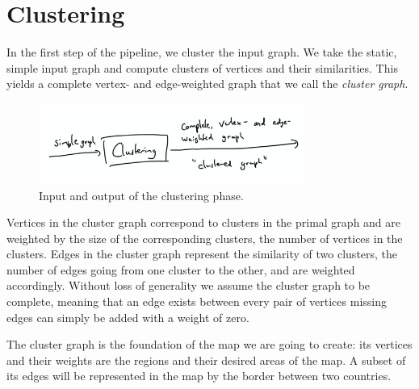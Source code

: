 \section{Clustering}
\label{sect:clustering}

In the first step of the pipeline, we cluster the input graph. We take the static, simple input graph and compute clusters of vertices and their similarities. This yields a complete vertex- and edge-weighted graph that we call the \emph{cluster graph}.

\begin{figure}[H]
	\centering\includegraphics[height=100px]{Resources/Pipeline-Clustering.png}
	\caption{Input and output of the clustering phase.}
	\label{fig:pipeline-clustering}
\end{figure}

Vertices in the cluster graph correspond to clusters in the primal graph and are weighted by the size of the corresponding clusters, \ie{} the number of vertices in the clusters. Edges in the cluster graph represent the similarity of two clusters, \ie{} the number of edges going from one cluster to the other, and are weighted accordingly. Without loss of generality we assume the cluster graph to be complete, meaning that an edge exists between every pair of vertices \emdash{} missing edges can simply be added with a weight of zero.

The cluster graph is the foundation of the map we are going to create: its vertices and their weights are the regions and their desired areas of the map. A subset of its edges will be represented in the map by the border between two countries.

